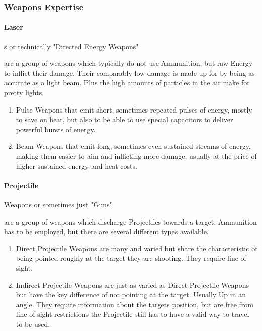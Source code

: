     \subsubsection{Weapons Expertise}
        \paragraph{Laser}s or technically "Directed Energy Weapons" \par are a group of weapons which typically
    do not use Ammunition, but raw Energy to inflict their damage.
    Their comparably low damage is made up for by being
    as accurate as a light beam.
    Plus the high amounts of particles in the air make for pretty lights.
        \begin{enumerate}[label= -]
            \item {Pulse} Weapons that emit short, sometimes repeated pulses of energy, mostly to save on heat, but also
            to be able to use special capacitors to deliver powerful bursts of energy.
            \item {Beam} Weapons that emit long, sometimes even sustained streams of energy, making them easier to aim
            and inflicting more damage, usually at the price of higher sustained energy and heat costs.
        \end{enumerate}
        \paragraph{Projectile} Weapons or sometimes just "Guns" \par are a group of weapons which discharge Projectiles
        towards a target.
        Ammunition has to be employed, but there are several different types available.
        \begin{enumerate}[label= -]
            \item{Direct} Projectile Weapons are many and varied but share the characteristic of being pointed roughly at
            the target they are shooting.
            They require line of sight.
            \item{Indirect} Projectile Weapons are just as varied as Direct Projectile Weapons but have the key difference
            of not pointing at the target.
            Usually Up in an angle.
            They require information about the targets position,
            but are free from line of sight restrictions the Projectile still has to have a valid way to travel to be used.
        \end{enumerate}
